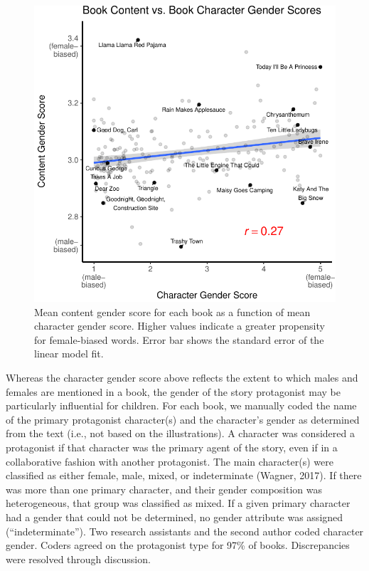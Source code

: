 \documentclass[english,,man,floatsintext]{apa6}
\begin{document}
\begin{figure}[t!]
\includegraphics{kidbookgender_files/figure-latex/charactercontentplot-1} \caption{Mean content gender score for each book as a function of mean character gender score. Higher values indicate a greater propensity for female-biased words. Error bar shows the standard error of the linear model fit.}\label{fig:charactercontentplot}
\end{figure}

Whereas the character gender score above reflects the extent to which males and females are mentioned in a book, the gender of the story protagonist may be particularly influential for children. For each book, we manually coded the name of the primary protagonist character(s) and the character's gender as determined from the text (i.e., not based on the illustrations). A character was considered a protagonist if that character was the primary agent of the story, even if in a collaborative fashion with another protagonist. The main character(s) were classified as either female, male, mixed, or indeterminate (Wagner, 2017). If there was more than one primary character, and their gender composition was heterogeneous, that group was classified as mixed. If a given primary character had a gender that could not be determined, no gender attribute was assigned (\enquote{indeterminate}). Two research assistants and the second author coded character gender. Coders agreed on the protagonist type for 97\% of books. Discrepancies were resolved through discussion.
\end{document}
